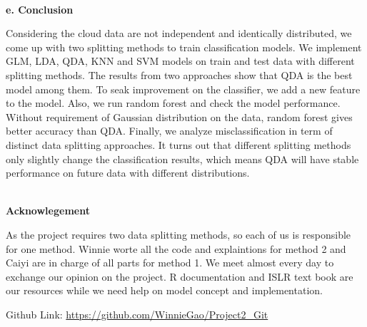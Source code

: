 \documentclass[11pt]{article}
\begin{document}
\vspace{0.3cm}
\mbox{}\\
\textbf{e. Conclusion}

Considering the cloud data are not independent and identically distributed, we come up with two splitting methods to train classification models. We implement GLM, LDA, QDA, KNN and SVM models on train and test data with different splitting methods. The results from two approaches show that QDA is the best model among them. To seak improvement on the classifier, we add a new feature to the model. Also, we run random forest and check the model performance. Without requirement of Gaussian distribution on the data, random forest gives better accuracy than QDA. Finally, we analyze misclassification in term of distinct data splitting approaches. It turns out that different splitting methods only slightly change the classification results, which means QDA will have stable performance on future data with different
distributions. 

\vspace{0.3cm}
\mbox{}\\
\textbf{Acknowlegement}

As the project requires two data splitting methods, so each of us is responsible for one method. Winnie worte all the code and explaintions for method 2 and Caiyi are in charge of all parts for method 1. We meet almost every day to exchange our opinion on the project. R documentation and ISLR text book are our resources while we need help on model concept and implementation. 

Github Link: \url{https://github.com/WinnieGao/Project2_Git}
\end{document}
